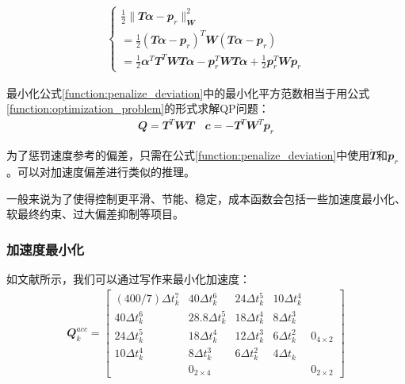\begin{align}
    \label{function:penalize_deviation}
    \begin{cases}
        \frac{1}{2}\|\mathbfit{T}\mathbfit{\alpha}-\mathbfit{p}_r\|^2_{\mathbfit{W}}\\
        =\frac{1}{2}(\mathbfit{T}\mathbfit{\alpha}-\mathbfit{p}_r)^T \mathbfit{W} (\mathbfit{T}\mathbfit{\alpha}-\mathbfit{p}_r)\\
        =\frac{1}{2}\mathbfit{\alpha}^T\mathbfit{T}^T \mathbfit{W} \mathbfit{T}\mathbfit{\alpha}-\mathbfit{p}_r^T \mathbfit{W} \mathbfit{T}\mathbfit{\alpha}+\frac{1}{2}\mathbfit{p}_r^T \mathbfit{W} \mathbfit{p}_r
    \end{cases}
\end{align}

最小化公式\eqref{function:penalize_deviation}中的最小化平方范数相当于用公式\eqref{function:optimization_problem}的形式求解QP问题：
\begin{align}
    \mathbfit{Q}=\mathbfit{T}^T\mathbfit{W}\mathbfit{T} \quad \mathbfit{c}=-\mathbfit{T}^T\mathbfit{W}^T\mathbfit{p}_r
\end{align}

为了惩罚速度参考的偏差，只需在公式\eqref{function:penalize_deviation}中使用$\mathbfit{\dot T}$和$\mathbfit{\dot p}_r$。可以对加速度偏差进行类似的推理。

一般来说为了使得控制更平滑、节能、稳定，成本函数会包括一些加速度最小化、软最终约束、过大偏差抑制等项目\cite[p5]{Bellicoso_Jenelten_Fankhauser_Gehring_Hwangbo_Hutter_2017}。


\subsubsection{加速度最小化}
如文献\cite[p]{Kalakrishnan_Buchli_Pastor_Mistry_Schaal_2010}所示，我们可以通过写作来最小化加速度：
\begin{align}
    \label{function:cost_Q_k1}
    {\mathbfit Q}_k^{acc} = 
    \begin{bmatrix}
    (400/7)\Delta t_k^7 & 40\Delta t_k^6 & 24\Delta t_k^5 & 10\Delta t_k^4 & \\
    40\Delta t_k^6 & 28.8\Delta t_k^5 & 18\Delta t_k^4 & 8\Delta t_k^3 & \\
    24\Delta t_k^5 & 18\Delta t_k^4 & 12\Delta t_k^3 & 6\Delta t_k^2 & {\mathbfit 0}_{4\times 2}\\
    10\Delta t_k^4 & 8\Delta t_k^3 & 6\Delta t_k^2 & 4\Delta t_k &\\
     & {\mathbfit 0}_{2\times 4} & & & {\mathbfit 0}_{2\times 2}
    \end{bmatrix}
\end{align}

